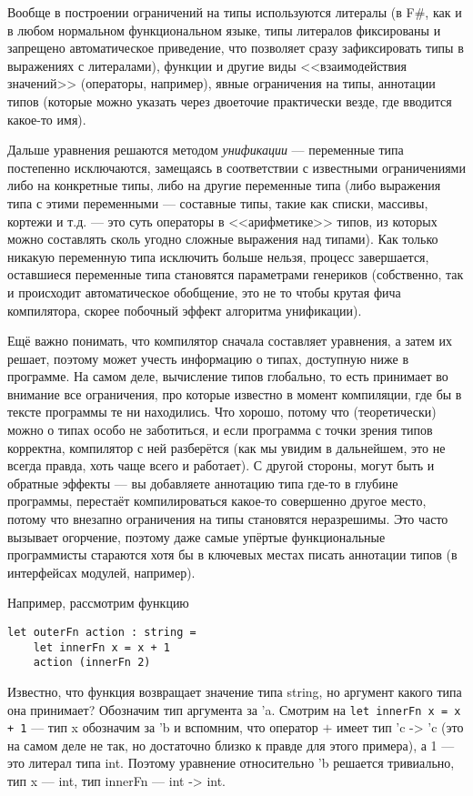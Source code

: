 \documentclass[a5paper]{article}
\begin{document}
Вообще в построении ограничений на типы используются литералы (в F\#, как и в любом нормальном функциональном языке, типы литералов фиксированы и запрещено автоматическое приведение, что позволяет сразу зафиксировать типы в выражениях с литералами), функции и другие виды <<взаимодействия значений>> (операторы, например), явные ограничения на типы, аннотации типов (которые можно указать через двоеточие практически везде, где вводится какое-то имя).

Дальше уравнения решаются методом \emph{унификации} --- переменные типа постепенно исключаются, замещаясь в соответствии с известными ограничениями либо на конкретные типы, либо на другие переменные типа (либо выражения типа с этими переменными --- составные типы, такие как списки, массивы, кортежи и т.д. --- это суть операторы в <<арифметике>> типов, из которых можно составлять сколь угодно сложные выражения над типами). Как только никакую переменную типа исключить больше нельзя, процесс завершается, оставшиеся переменные типа становятся параметрами генериков (собственно, так и происходит автоматическое обобщение, это не то чтобы крутая фича компилятора, скорее побочный эффект алгоритма унификации). 

Ещё важно понимать, что компилятор сначала составляет уравнения, а затем их решает, поэтому может учесть информацию о типах, доступную ниже в программе. На самом деле, вычисление типов глобально, то есть принимает во внимание все ограничения, про которые известно в момент компиляции, где бы в тексте программы те ни находились. Что хорошо, потому что (теоретически) можно о типах особо не заботиться, и если программа с точки зрения типов корректна, компилятор с ней разберётся (как мы увидим в дальнейшем, это не всегда правда, хоть чаще всего и работает). С другой стороны, могут быть и обратные эффекты --- вы добавляете аннотацию типа где-то в глубине программы, перестаёт компилироваться какое-то совершенно другое место, потому что внезапно ограничения на типы становятся неразрешимы. Это часто вызывает огорчение, поэтому даже самые упёртые функциональные программисты стараются хотя бы в ключевых местах писать аннотации типов (в интерфейсах модулей, например).

Например, рассмотрим функцию

\begin{verbatim}
let outerFn action : string =
    let innerFn x = x + 1
    action (innerFn 2)
\end{verbatim}

Известно, что функция возвращает значение типа string, но аргумент какого типа она принимает? Обозначим тип аргумента за 'a. Смотрим на \texttt{let innerFn x = x + 1} --- тип x обозначим за 'b и вспомним, что оператор $+$ имеет тип 'c -> 'c  (это на самом деле не так, но достаточно близко к правде для этого примера), а 1 --- это литерал типа int. Поэтому уравнение относительно 'b решается тривиально, тип x --- int, тип innerFn --- int -> int. 
\end{document}
